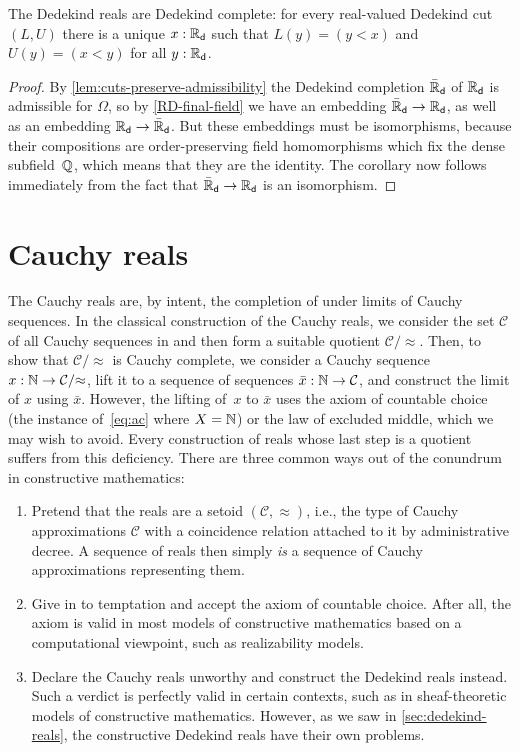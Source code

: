 \begin{cor} \label{RD-dedekind-complete}
  The Dedekind reals are Dedekind complete: for every real-valued Dedekind cut $(L, U)$
  there is a unique $x : \mathbb{R}_\mathsf{d}$ such that $L(y) = (y < x)$ and $U(y) = (x < y)$ for all $y :
  \mathbb{R}_\mathsf{d}$.
\end{cor}

\begin{proof}
  By \autoref{lem:cuts-preserve-admissibility} the Dedekind completion $\bar{\mathbb{R}}_\mathsf{d}$ of $\mathbb{R}_\mathsf{d}$
  is admissible for $\Omega$, so by \autoref{RD-final-field} we have an embedding $\bar{\mathbb{R}}_\mathsf{d}
  \to \mathbb{R}_\mathsf{d}$, as well as an embedding $\mathbb{R}_\mathsf{d} \to \bar{\mathbb{R}}_\mathsf{d}$. But these embeddings must be
  isomorphisms, because their compositions are order-preserving field homomorphisms which
  fix the dense subfield~$\mathbb{Q}$, which means that they are the identity. The corollary now
  follows immediately from the fact that $\bar{\mathbb{R}}_\mathsf{d} \to \mathbb{R}_\mathsf{d}$ is an isomorphism.
\end{proof}

\section{Cauchy reals}
\label{sec:cauchy-reals}

The Cauchy reals are, by intent, the completion of \Q under limits of Cauchy sequences.
In the classical construction of the Cauchy reals, we consider the set $\mathcal{C}$ of all Cauchy sequences in \Q and then form a suitable quotient $\mathcal{C}/{\approx}$.
Then, to show that $\mathcal{C}/{\approx}$ is Cauchy complete, we consider a Cauchy sequence $x : \mathbb{N} \to \mathcal{C}/{\approx}$, lift it to a sequence of sequences $\bar{x} : \mathbb{N} \to \mathcal{C}$, and construct the limit of $x$ using $\bar{x}$. However, the lifting of~$x$ to $\bar{x}$ uses
the axiom of countable choice (the instance of~\eqref{eq:ac} where $X=\mathbb{N}$) or the law of excluded middle, which we may wish to avoid.
Every construction of reals whose last step is a quotient suffers from this deficiency.
There are three common ways out of the conundrum in constructive mathematics:
%
\begin{enumerate}
\item Pretend that the reals are a setoid $(\mathcal{C}, {\approx})$, i.e., the type of
  Cauchy approximations $\mathcal{C}$ with a coincidence relation attached to it by
  administrative decree. A sequence of reals then simply \emph{is} a sequence of Cauchy
  approximations representing them.
\item Give in to temptation and accept the axiom of countable choice. After all, the axiom
  is valid in most models of constructive mathematics based on a computational viewpoint,
  such as realizability models.
\item Declare the Cauchy reals unworthy and construct the Dedekind reals instead.
  Such a verdict is perfectly valid in certain contexts, such as in sheaf-theoretic models of constructive mathematics.
  However, as we saw in \autoref{sec:dedekind-reals}, the constructive Dedekind reals have their own problems.
\end{enumerate}

